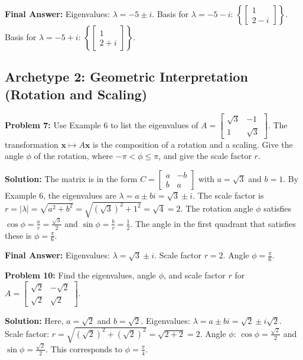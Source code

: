 \documentclass[11pt, letterpaper]{article}
\theoremstyle{definition}
\theoremstyle{remark}
\begin{document}
\textbf{Final Answer:} 
Eigenvalues: $\lambda = -5 \pm i$. 
Basis for $\lambda = -5 - i$: $\left\{ \begin{bmatrix} 1 \\ 2 - i \end{bmatrix} \right\}$. 
Basis for $\lambda = -5 + i$: $\left\{ \begin{bmatrix} 1 \\ 2 + i \end{bmatrix} \right\}$.

\subsection{Archetype 2: Geometric Interpretation (Rotation and Scaling)}

\textbf{Problem 7:} Use Example 6 to list the eigenvalues of $A = \begin{bmatrix} \sqrt{3} & -1 \\ 1 & \sqrt{3} \end{bmatrix}$. The transformation $\mathbf{x} \mapsto A\mathbf{x}$ is the composition of a rotation and a scaling. Give the angle $\phi$ of the rotation, where $-\pi < \phi \le \pi$, and give the scale factor $r$.

\textbf{Solution:}
The matrix is in the form $C = \begin{bmatrix} a & -b \\ b & a \end{bmatrix}$ with $a = \sqrt{3}$ and $b = 1$.
By Example 6, the eigenvalues are $\lambda = a \pm bi = \sqrt{3} \pm i$.
The scale factor is $r = |\lambda| = \sqrt{a^2 + b^2} = \sqrt{(\sqrt{3})^2 + 1^2} = \sqrt{4} = 2$.
The rotation angle $\phi$ satisfies $\cos\phi = \frac{a}{r} = \frac{\sqrt{3}}{2}$ and $\sin\phi = \frac{b}{r} = \frac{1}{2}$.
The angle in the first quadrant that satisfies these is $\phi = \frac{\pi}{6}$.

\textbf{Final Answer:} Eigenvalues: $\lambda = \sqrt{3} \pm i$. Scale factor $r = 2$. Angle $\phi = \frac{\pi}{6}$.

\vspace{1em}

\textbf{Problem 10:} Find the eigenvalues, angle $\phi$, and scale factor $r$ for $A = \begin{bmatrix} \sqrt{2} & -\sqrt{2} \\ \sqrt{2} & \sqrt{2} \end{bmatrix}$.

\textbf{Solution:}
Here, $a = \sqrt{2}$ and $b = \sqrt{2}$.
Eigenvalues: $\lambda = a \pm bi = \sqrt{2} \pm i\sqrt{2}$.
Scale factor: $r = \sqrt{(\sqrt{2})^2 + (\sqrt{2})^2} = \sqrt{2 + 2} = 2$.
Angle $\phi$: $\cos\phi = \frac{\sqrt{2}}{2}$ and $\sin\phi = \frac{\sqrt{2}}{2}$. This corresponds to $\phi = \frac{\pi}{4}$.
\end{document}
